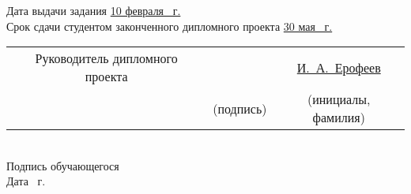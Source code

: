 {  \vspace{2em}

  Дата выдачи задания \uline{10 февраля \the\year{}~г.}\lineunderscore\\
  Срок сдачи студентом законченного дипломного проекта \uline{30 мая \the\year{}~г.}\lineunderscore\\

  \begin{tabularx}{\textwidth}{@{}c c c}
    Руководитель дипломного проекта & \uline{\hspace*{6em}} & \hspace{1.2em}\uline{И.~А.~Ерофеев\hspace{3em}}\\
    & {\footnotesize(подпись)} & {\footnotesize(инициалы, фамилия)}\\
  \end{tabularx}\\

  Подпись обучающегося \uline{\hspace*{10em}}\\[0.5em]
  Дата \underline{\hspace*{2em}} \underline{\hspace*{5.7em}} \the\year{}~г.

  \restoregeometry
}